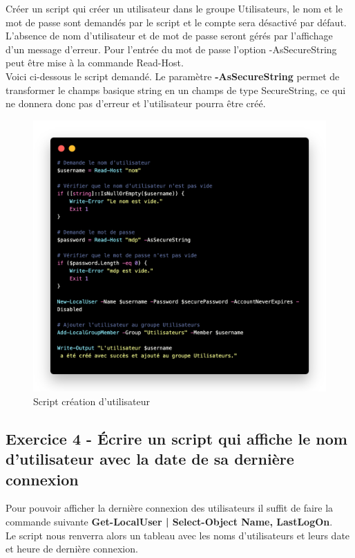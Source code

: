 \documentclass[12pt, a4paper]{article}
\begin{document}
Créer un script qui créer un utilisateur dans le groupe Utilisateurs, le nom 
et le mot de passe sont demandés par le script et le compte sera désactivé 
par défaut. L’absence de nom d’utilisateur et de mot de passe seront gérés par 
l’affichage d’un message d’erreur. Pour l’entrée du mot de passe l’option 
-AsSecureString peut être mise à la commande Read-Host.\\

\newpage
Voici ci-dessous le script demandé. Le paramètre \textbf{-AsSecureString}
permet de transformer le champs basique string en un champs de type SecureString,
ce qui ne donnera donc pas d'erreur et l'utilisateur pourra être créé.\\

\begin{figure}[h]
    \centering
    \includegraphics[width=1\textwidth]{img/code1.png}
    \caption{Script création d'utilisateur}
    \label{fig:script1}
\end{figure}

\newpage
\subsection{Exercice 4 - Écrire un script qui affiche le nom d’utilisateur avec la date de sa dernière connexion}
Pour pouvoir afficher la dernière connexion des utilisateurs il suffit de faire 
la commande suivante \textbf{Get-LocalUser | Select-Object Name, LastLogOn}.\\
Le script nous renverra alors un tableau avec les noms d'utilisateurs et leurs 
date et heure de dernière connexion. 
\end{document}
